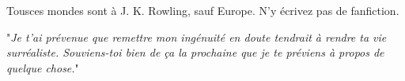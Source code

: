 Tousces mondes sont à J. K. Rowling, sauf Europe. N'y écrivez pas de fanfiction.

"\emph{Je t'ai \emph{prévenue} que remettre mon ingénuité en doute tendrait à rendre ta vie surréaliste. Souviens-toi bien de ça la prochaine que je te préviens à propos de quelque chose.}"

